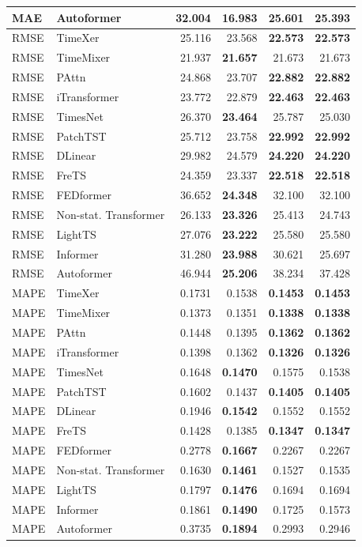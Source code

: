 \begin{longtable}{llrrrr}
MAE & Autoformer & 32.004 & \textbf{16.983} & 25.601 & 25.393 \\
\midrule
RMSE & TimeXer & 25.116 & 23.568 & \textbf{22.573} & \textbf{22.573} \\
RMSE & TimeMixer & 21.937 & \textbf{21.657} & 21.673 & 21.673 \\
RMSE & PAttn & 24.868 & 23.707 & \textbf{22.882} & \textbf{22.882} \\
RMSE & iTransformer & 23.772 & 22.879 & \textbf{22.463} & \textbf{22.463} \\
RMSE & TimesNet & 26.370 & \textbf{23.464} & 25.787 & 25.030 \\
RMSE & PatchTST & 25.712 & 23.758 & \textbf{22.992} & \textbf{22.992} \\
RMSE & DLinear & 29.982 & 24.579 & \textbf{24.220} & \textbf{24.220} \\
RMSE & FreTS & 24.359 & 23.337 & \textbf{22.518} & \textbf{22.518} \\
RMSE & FEDformer & 36.652 & \textbf{24.348} & 32.100 & 32.100 \\
RMSE & Non-stat. Transformer & 26.133 & \textbf{23.326} & 25.413 & 24.743 \\
RMSE & LightTS & 27.076 & \textbf{23.222} & 25.580 & 25.580 \\
RMSE & Informer & 31.280 & \textbf{23.988} & 30.621 & 25.697 \\
RMSE & Autoformer & 46.944 & \textbf{25.206} & 38.234 & 37.428 \\
\midrule
MAPE & TimeXer & 0.1731 & 0.1538 & \textbf{0.1453} & \textbf{0.1453} \\
MAPE & TimeMixer & 0.1373 & 0.1351 & \textbf{0.1338} & \textbf{0.1338} \\
MAPE & PAttn & 0.1448 & 0.1395 & \textbf{0.1362} & \textbf{0.1362} \\
MAPE & iTransformer & 0.1398 & 0.1362 & \textbf{0.1326} & \textbf{0.1326} \\
MAPE & TimesNet & 0.1648 & \textbf{0.1470} & 0.1575 & 0.1538 \\
MAPE & PatchTST & 0.1602 & 0.1437 & \textbf{0.1405} & \textbf{0.1405} \\
MAPE & DLinear & 0.1946 & \textbf{0.1542} & 0.1552 & 0.1552 \\
MAPE & FreTS & 0.1428 & 0.1385 & \textbf{0.1347} & \textbf{0.1347} \\
MAPE & FEDformer & 0.2778 & \textbf{0.1667} & 0.2267 & 0.2267 \\
MAPE & Non-stat. Transformer & 0.1630 & \textbf{0.1461} & 0.1527 & 0.1535 \\
MAPE & LightTS & 0.1797 & \textbf{0.1476} & 0.1694 & 0.1694 \\
MAPE & Informer & 0.1861 & \textbf{0.1490} & 0.1725 & 0.1573 \\
MAPE & Autoformer & 0.3735 & \textbf{0.1894} & 0.2993 & 0.2946 \\
\end{longtable}
\endgroup

